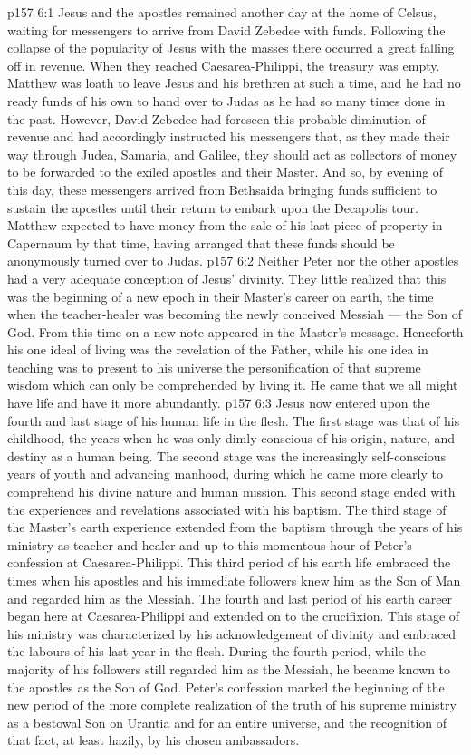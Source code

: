 \vs p157 6:1 Jesus and the apostles remained another day at the home of Celsus, waiting for messengers to arrive from David Zebedee with funds. Following the collapse of the popularity of Jesus with the masses there occurred a great falling off in revenue. When they reached Caesarea\hyp{}Philippi, the treasury was empty. Matthew was loath to leave Jesus and his brethren at such a time, and he had no ready funds of his own to hand over to Judas as he had so many times done in the past. However, David Zebedee had foreseen this probable diminution of revenue and had accordingly instructed his messengers that, as they made their way through Judea, Samaria, and Galilee, they should act as collectors of money to be forwarded to the exiled apostles and their Master. And so, by evening of this day, these messengers arrived from Bethsaida bringing funds sufficient to sustain the apostles until their return to embark upon the Decapolis tour. Matthew expected to have money from the sale of his last piece of property in Capernaum by that time, having arranged that these funds should be anonymously turned over to Judas.
\vs p157 6:2 \pc Neither Peter nor the other apostles had a very adequate conception of Jesus’ divinity. They little realized that this was the beginning of a new epoch in their Master’s career on earth, the time when the teacher\hyp{}healer was becoming the newly conceived Messiah --- the Son of God. From this time on a new note appeared in the Master’s message. Henceforth his one ideal of living was the revelation of the Father, while his one idea in teaching was to present to his universe the personification of that supreme wisdom which can only be comprehended by living it. He came that we all might have life and have it more abundantly.
\vs p157 6:3 Jesus now entered upon the fourth and last stage of his human life in the flesh. The first stage was that of his childhood, the years when he was only dimly conscious of his origin, nature, and destiny as a human being. The second stage was the increasingly self\hyp{}conscious years of youth and advancing manhood, during which he came more clearly to comprehend his divine nature and human mission. This second stage ended with the experiences and revelations associated with his baptism. The third stage of the Master’s earth experience extended from the baptism through the years of his ministry as teacher and healer and up to this momentous hour of Peter’s confession at Caesarea\hyp{}Philippi. This third period of his earth life embraced the times when his apostles and his immediate followers knew him as the Son of Man and regarded him as the Messiah. The fourth and last period of his earth career began here at Caesarea\hyp{}Philippi and extended on to the crucifixion. This stage of his ministry was characterized by his acknowledgement of divinity and embraced the labours of his last year in the flesh. During the fourth period, while the majority of his followers still regarded him as the Messiah, he became known to the apostles as the Son of God. Peter’s confession marked the beginning of the new period of the more complete realization of the truth of his supreme ministry as a bestowal Son on Urantia and for an entire universe, and the recognition of that fact, at least hazily, by his chosen ambassadors.
